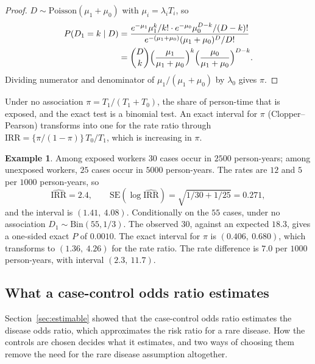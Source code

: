 \documentclass[11pt,a4paper]{article}
\numberwithin{equation}{section}
\theoremstyle{definition}
\newtheorem{exa}[thm]{Example}
\begin{document}
\begin{proof}
$D \sim \text{Poisson}(\mu_1 + \mu_0)$ with $\mu_i = \lambda_i T_i$, so
\begin{align*}
P(D_1 = k \mid D) &= \frac{e^{-\mu_1}\mu_1^k/k! \cdot e^{-\mu_0}\mu_0^{D - k}/(D - k)!}{e^{-(\mu_1 + \mu_0)}(\mu_1 + \mu_0)^D/D!} \\
&= \binom{D}{k}\Bigl(\frac{\mu_1}{\mu_1 + \mu_0}\Bigr)^k\Bigl(\frac{\mu_0}{\mu_1 + \mu_0}\Bigr)^{D - k} .
\end{align*}
Dividing numerator and denominator of $\mu_1/(\mu_1 + \mu_0)$ by $\lambda_0$ gives $\pi$.
\end{proof}

Under no association $\pi = T_1/(T_1 + T_0)$, the share of person-time that is exposed, and the exact test is a binomial test. An exact
interval for $\pi$ (Clopper--Pearson) transforms into one for the rate ratio through $\text{IRR} = \{\pi/(1 - \pi)\}\,T_0/T_1$, which is increasing in $\pi$.

\begin{exa}
\label{exa:rates}
Among exposed workers $30$ cases occur in $2500$ person-years; among unexposed workers, $25$ cases occur in $5000$
person-years. The rates are $12$ and $5$ per $1000$ person-years, so
\[
\widehat{\text{IRR}} = 2.4, \qquad \text{SE}(\log\widehat{\text{IRR}}) = \sqrt{1/30 + 1/25} = 0.271 ,
\]
and the interval is $(1.41,\ 4.08)$. Conditionally on the $55$ cases, under no association $D_1 \sim \text{Bin}(55, 1/3)$. The observed $30$,
against an expected $18.3$, gives a one-sided exact $P$ of $0.0010$. The exact interval for $\pi$ is $(0.406,\ 0.680)$, which transforms
to $(1.36,\ 4.26)$ for the rate ratio. The rate difference is $7.0$ per $1000$ person-years, with interval $(2.3,\ 11.7)$.
\end{exa}

\subsection{What a case-control odds ratio estimates}
\label{sec:ccsampling}

Section~\ref{sec:estimable} showed that the case-control odds ratio estimates the disease odds ratio, which approximates the risk ratio
for a rare disease. How the controls are chosen decides what it estimates, and two ways of choosing them remove the need for the
rare disease assumption altogether.
\end{document}

